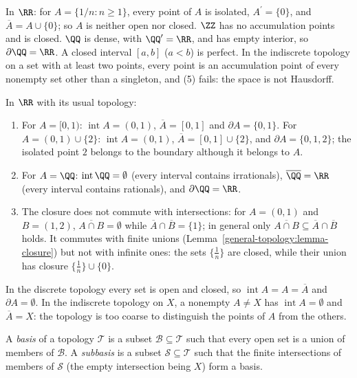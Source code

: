 \begin{example}\label{general-topology:example-accumulation}
In $\RR$: for $A = \{1/n : n \geq 1\}$, every point of $A$ is isolated, $A^{\prime} = \{0\}$, and $\overline{A} = A \cup \{0\}$; so $A$ is neither open nor closed. $\ZZ$ has no accumulation points
and is closed. $\QQ$ is dense, with $\QQ^{\prime} = \RR$, and has empty interior, so $\partial\QQ = \RR$. A closed interval $[a, b]$ ($a < b$) is perfect. In the indiscrete topology on a set with at
least two points, every point is an accumulation point of every nonempty set other than a singleton, and (5) fails: the space is not Hausdorff.
\end{example}

\begin{example}\label{general-topology:example-closure-computations}
In $\RR$ with its usual topology:
\begin{enumerate}
\item For $A = [0, 1)$: $\operatorname{int}A = (0, 1)$, $\overline{A} = [0, 1]$ and $\partial A = \{0, 1\}$. For $A = (0, 1) \cup \{2\}$: $\operatorname{int}A = (0, 1)$, $\overline{A} = [0, 1] \cup \{2\}$, and
$\partial A = \{0, 1, 2\}$; the isolated point $2$ belongs to the boundary although it belongs to $A$.
\item For $A = \QQ$: $\operatorname{int}\QQ = \emptyset$ (every interval contains irrationals), $\overline{\QQ} = \RR$ (every interval contains rationals), and $\partial\QQ = \RR$.
\item The closure does not commute with intersections: for $A = (0, 1)$ and $B = (1, 2)$, $\overline{A \cap B} = \emptyset$ while $\overline{A} \cap \overline{B} = \{1\}$; in general only
$\overline{A \cap B} \subseteq \overline{A} \cap \overline{B}$ holds. It commutes with finite unions (Lemma~\ref{general-topology:lemma-closure}) but not with infinite ones: the sets $\{\frac1n\}$ are closed,
while their union has closure $\{\frac1n\} \cup \{0\}$.
\end{enumerate}
In the discrete topology every set is open and closed, so $\operatorname{int}A = A = \overline{A}$ and $\partial A = \emptyset$. In the indiscrete topology on $X$, a nonempty $A \neq X$ has
$\operatorname{int}A = \emptyset$ and $\overline{A} = X$: the topology is too coarse to distinguish the points of $A$ from the others.
\end{example}

\begin{definition}\label{general-topology:definition-basis}
A \emph{basis} of a topology $\mathcal{T}$ is a subset $\mathcal{B} \subseteq \mathcal{T}$ such that every open set is a union of members
of $\mathcal{B}$. A \emph{subbasis} is a subset $\mathcal{S} \subseteq \mathcal{T}$ such that the finite intersections of members of $\mathcal{S}$
(the empty intersection being $X$) form a basis.
\end{definition}


